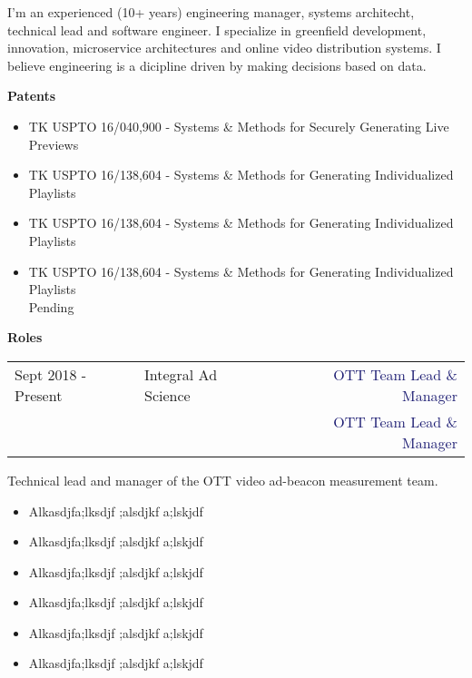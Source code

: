 \documentclass[11pt]{article}
\begin{document}
I'm an experienced (10+ years) engineering manager, systems
architecht, technical lead and software engineer. I specialize in
greenfield development, innovation, microservice architectures and
online video distribution systems. I believe engineering is a
dicipline driven by making decisions based on data.
\vspace{5pt}

\textbf{Patents}
\begin{itemize}[nosep,label=-,leftmargin=*]
\item TK USPTO 16/040,900 - Systems \& Methods for Securely Generating Live Previews
\item TK USPTO 16/138,604 - Systems \& Methods for Generating Individualized Playlists
\item TK USPTO 16/138,604 - Systems \& Methods for Generating Individualized Playlists
\item TK USPTO 16/138,604 - Systems \& Methods for Generating Individualized Playlists\\{\tiny Pending}
\end{itemize}
  
    
\vspace{5pt}

\textbf{Roles}

\begin{tabularx}{\textwidth}{@{}llXr}
  Sept 2018 - Present & \textcolor{Mahogany}{Integral Ad Science} && \textcolor{MidnightBlue}{OTT Team Lead \& Manager}\\
  &&&\textcolor{MidnightBlue}{OTT Team Lead \& Manager}
\end{tabularx}
Technical lead and manager of the OTT video ad-beacon measurement team.
\begin{multicols}{2}
  \begin{itemize}[nosep,label=-,leftmargin=*]
  \item Alkasdjfa;lksdjf ;alsdjkf a;lskjdf
  \item Alkasdjfa;lksdjf ;alsdjkf a;lskjdf
  \item Alkasdjfa;lksdjf ;alsdjkf a;lskjdf
  \item Alkasdjfa;lksdjf ;alsdjkf a;lskjdf
  \item Alkasdjfa;lksdjf ;alsdjkf a;lskjdf
  \item Alkasdjfa;lksdjf ;alsdjkf a;lskjdf 
  \end{itemize}
\end{multicols}
\vspace{5pt}
\end{document}
